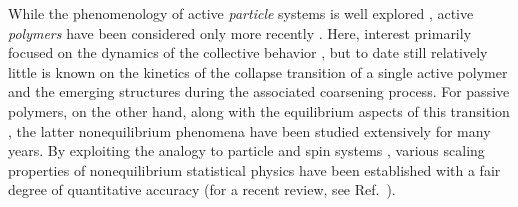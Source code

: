 \documentclass[aps,prx,reprint,showpacs,showkeys,noeprint,longbibliography]{revtex4-1} %
\begin{document}
While the phenomenology of active {\em particle\/} systems is well explored \cite{ramasw1, cates1, elgeti1, shaeb,vicsek,toner,chate2,tailleur,chate1,jiang,hagen,mcand,mishra1,menzel,fily,farrell,redner,trefz16,das1,desei,paul1,skdas14}, active {\em polymers\/} have been considered only more recently \cite{winkler2020rev,holder,kaiser,ravi,sarkar,duman,bianco,paul_soft20,ramirez,biswas,daiki}. Here, interest primarily focused on the dynamics of the collective behavior \cite{winkler2020rev,holder,duman}, but to date still relatively little is known on the kinetics of the collapse transition of a single active polymer and the emerging structures during the associated coarsening process. For passive polymers, on the other hand, along with the equilibrium aspects of this transition \cite{stockmayer,gennes,sun,doi}, the 
latter nonequilibrium phenomena \cite{byrne,halperin, montesi,guo,majumder1,bunin,christiansen, majumder3, majumder4} have been studied extensively 
for many
years. By exploiting the analogy to particle and spin systems \cite{bray,puri}, various scaling properties of nonequilibrium statistical physics have been established with a fair degree of quantitative accuracy (for a recent review, see Ref.~\cite{majumder4}).
\end{document}
